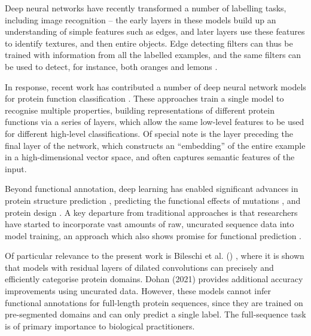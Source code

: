
Deep neural networks have recently transformed a number of labelling tasks, including image recognition -- the early layers in these models build up an understanding of simple features such as edges, and later layers use these features to identify textures, and then entire objects. Edge detecting filters can thus be trained with information from all the labelled examples, and the same filters can be used to detect, for instance, both oranges and lemons \cite{activationatlas}.

In response, recent work has contributed a number of deep neural network models for protein function classification \citep{ecpred,deepgo,prolango,deeploc,dspace,deepred,deepre,deepsf,littmann2021embeddings}. These approaches train a single model to recognise multiple properties, building representations of different protein functions via a series of layers, which allow the same low-level features to be used for different high-level classifications. Of special note is the layer preceding the final layer of the network, which constructs an ``embedding'' of the entire example in a high-dimensional vector space, and often captures semantic features of the input. 

Beyond functional annotation, deep learning has enabled significant advances in protein structure prediction \cite{alquraishi2019end, senior2020improved, Yang1496, yang2020improved, du2020energy, rao2021msa}, predicting the functional effects of mutations \cite{riesselman2018deep,rives2019biological,rao2019evaluating,frazer2020large}, and protein design \cite{yang2019machine, mazurenko2019machine, biswas2020low, madani2020progen,elnaggar2020prottrans, anishchenko2020novo, bryant2021deep}. A key departure from traditional approaches is that researchers have started to incorporate vast amounts of raw, uncurated sequence data into model training, an approach which also shows promise for functional prediction \citep{Brandes2021}. 

Of particular relevance to the present work is Bileschi et al. (\DIFdelbegin {}\DIFdelend \DIFaddbegin {}\DIFaddend ) \citep{bileschi}, where it is shown that models with residual layers \citep{resnet} of dilated convolutions \citep{dilatedconvolutions} can precisely and efficiently categorise protein domains.  Dohan (2021) \cite{dohan2021kdd} provides additional accuracy improvements using uncurated data. However, these models cannot infer functional annotations for full-length protein sequences, since they are trained on pre-segmented domains and can only predict a single label. The full-sequence task is of primary importance to biological practitioners.

